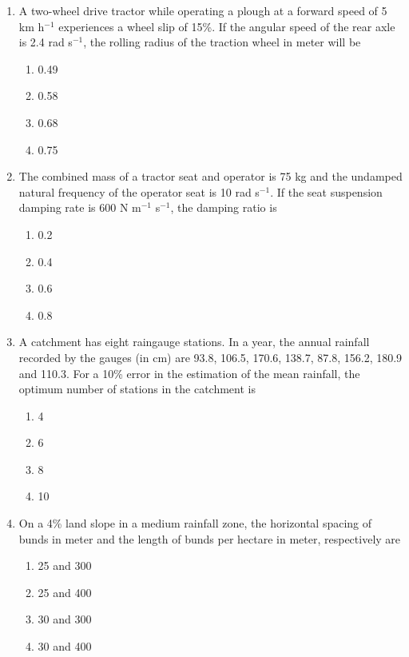\documentclass[12pt]{article}
\begin{document}
\begin{enumerate}[label =Q.\arabic*,start=26]
		\item A two-wheel drive tractor while operating a plough at a forward speed of 5 km h$^{-1}$ experiences a wheel slip of 15\%. If the angular speed of the rear axle is 2.4 rad s$^{-1}$, the rolling radius of the traction wheel in meter will be
			\begin{multicols}{4}
				\begin{enumerate}[label=(\Alph*)]
					\item 0.49
					\item 0.58
					\item 0.68
					\item 0.75
				\end{enumerate}
			\end{multicols}
			\newpage
		\item The combined mass of a tractor seat and operator is 75 kg and the undamped natural frequency of the operator seat is 10 rad s$^{-1}$. If the seat suspension damping rate is 600 N m$^{-1}$ s$^{-1}$, the damping ratio is
			\begin{multicols}{4}
				\begin{enumerate}[label=(\Alph*)]
					\item 0.2
					\item 0.4
					\item 0.6
					\item 0.8
				\end{enumerate}
			\end{multicols}
		\item A catchment has eight raingauge stations. In a year, the annual rainfall recorded by the gauges (in cm) are 93.8, 106.5, 170.6, 138.7, 87.8, 156.2, 180.9 and 110.3. For a 10\% error in the estimation of the mean rainfall, the optimum number of stations in the catchment is
			\begin{multicols}{4}
				\begin{enumerate}[label=(\Alph*)]
					\item 4
					\item 6
					\item 8
					\item 10
				\end{enumerate}
			\end{multicols}

		\item On a 4\% land slope in a medium rainfall zone, the horizontal spacing of bunds in meter and the length of bunds per hectare in meter, respectively are
			\begin{multicols}{4}
				\begin{enumerate}[label=(\Alph*)]
					\item 25 and 300
					\item 25 and 400
					\item 30 and 300
					\item 30 and 400
				\end{enumerate}
			\end{multicols}


\end{enumerate}
\end{document}
